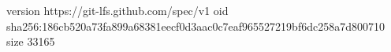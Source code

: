 version https://git-lfs.github.com/spec/v1
oid sha256:186cb520a73fa899a68381eecf0d3aac0c7eaf965527219bf6dc258a7d800710
size 33165
